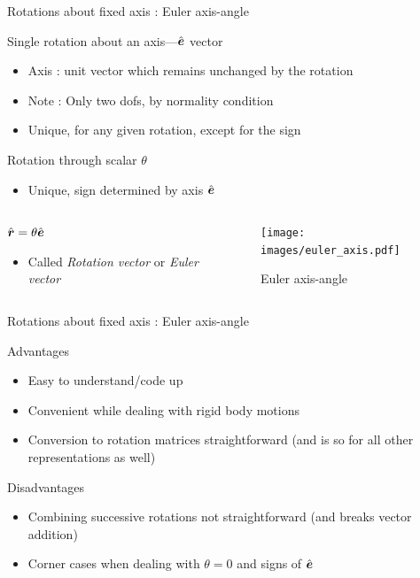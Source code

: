 \documentclass[notes]{beamer}
\newcommand{\gv}[1]{\ensuremath{\mbox{\boldmath$ #1 $}}}
\begin{document}
\begin{frame}[label={sec:org6e11d30}]{Rotations about fixed axis : Euler axis-angle}
\begin{block}{Single rotation about an axis---\(\hat{\gv{e}}\) vector}
\begin{itemize}
\item Axis : unit vector which remains unchanged by the rotation
\item Note : Only two dofs, by normality condition
\item Unique, for any given rotation, except for the sign
\end{itemize}
\end{block}
\begin{block}{Rotation through scalar \(\theta\)}
\begin{itemize}
\item Unique, sign determined by axis \(\hat{\gv{e}}\)
\end{itemize}
\end{block}
\begin{columns}
\begin{column}{0.6\columnwidth}
\begin{block}{\(\hat{\gv{r}} = \theta \hat{\gv{e}}\)}
\begin{itemize}
\item Called \emph{Rotation vector} or \emph{Euler vector}
\end{itemize}
\end{block}
\end{column}
\begin{column}{0.3\columnwidth}
\begin{figure}[htbp]
\centering
\texttt{[image: images/euler\_axis.pdf]}
\caption{Euler axis-angle}
\end{figure}
\end{column}
\end{columns}
\end{frame}
\begin{frame}[label={sec:orgd13c83a}]{Rotations about fixed axis : Euler axis-angle}
\begin{block}{Advantages}
\begin{itemize}
\item Easy to understand/code up
\item Convenient while dealing with rigid body motions
\item Conversion to rotation matrices straightforward (and is so for all other
representations as well)
\end{itemize}
\end{block}
\begin{block}{Disadvantages}
\begin{itemize}
\item Combining successive rotations not straightforward (and breaks vector addition)
\item Corner cases when dealing with \(\theta = 0\) and signs of \(\hat{\gv{e}}\)
\end{itemize}
\end{block}
\end{frame}
\end{document}

